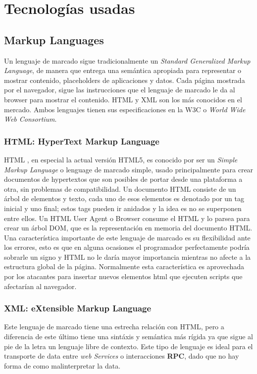 \section{Tecnologías usadas}

    \subsection{Markup Languages}
    \label{chap2:markup}
        Un lenguaje de marcado sigue tradicionalmente un \textit{Standard Generalized Markup Language}, de manera que entrega una semántica apropiada para representar o mostrar contenido, placeholders de aplicaciones y datos. Cada página mostrada por el navegador, sigue las instrucciones que el lenguaje de marcado le da al browser para mostrar el contenido. HTML y XML son los más conocidos en el mercado. Ambos lenguajes tienen sus especificaciones en la W3C o \textit{World Wide Web Consortium}.

        \subsubsection{HTML: HyperText Markup Language}
        \label{chap2:HTML}
        HTML \cite{htmlSpec}, en especial la actual versión HTML5, es conocido por ser un \textit{Simple Markup Language} o lenguage de marcado simple, usado principalmente para crear documentos de hypertextos que son posibles de portar desde una plataforma a otra, sin problemas de compatibilidad. Un documento HTML consiste de un árbol de elementos y texto, cada uno de esos elementos es denotado por un tag inicial y uno final; estos tags pueden ir anidados y la idea es no se superponen entre ellos. Un HTML User Agent o Browser consume el HTML y lo parsea para crear un árbol DOM, que es la representación en memoria del documento HTML.
        Una característica importante de este lenguaje de marcado es su flexibilidad ante los errores, esto es que en alguna ocasiones el programador perfectamente podría sobrarle un signo y HTML no le daría mayor importancia mientras no afecte a la estructura global de la página. Normalmente esta característica es aprovechada por los atacantes para insertar nuevos elementos html que ejecuten scripts que afectarían al navegador.


        \subsubsection{XML: eXtensible Markup Language}
        \label{chap2:XML}
        Este lenguaje de marcado tiene una estrecha relación con HTML, pero a diferencia de este último tiene una sintáxis y semántica más rígida ya que sigue al pie de la letra un lenguaje libre de contexto. Este tipo de lenguaje es ideal para el transporte de data entre \textit{web Services} o interacciones \textbf{RPC}, dado que no hay forma de como malinterpretar la data.


